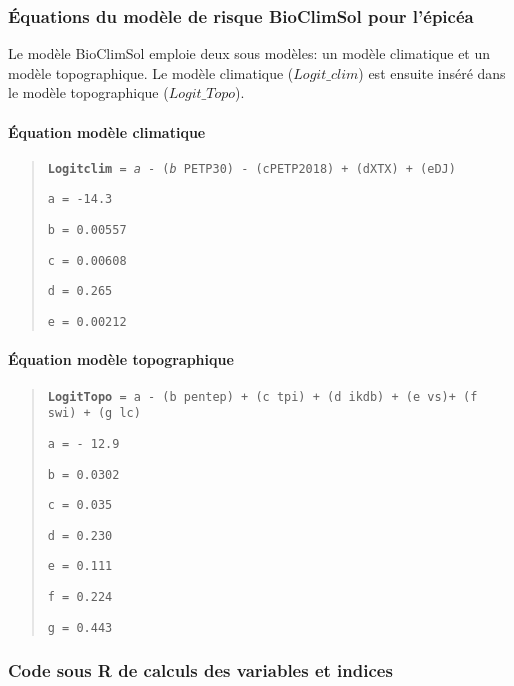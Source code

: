 \subsubsection{Équations du modèle de risque BioClimSol pour l'épicéa}

Le modèle BioClimSol emploie deux sous modèles: un modèle climatique et un modèle topographique. Le modèle climatique ($Logit\_clim$) est ensuite inséré dans le modèle topographique ($Logit\_Topo$). 

 
 \paragraph{Équation modèle climatique}
 \begin{quote}

\texttt{\textbf{Logit\textunderscore clim} = \textit{a} - (\textit{b} \times PETP30) - (c\times PETP2018) + (d\times XTX) + (e\times DJ)}

\texttt{a = -14.3}

\texttt{b = 0.00557}

\texttt {c = 0.00608}

\texttt{d = 0.265}

\texttt{e = 0.00212}
  \end{quote}





     
\paragraph{Équation modèle topographique}
\begin{quote}
    

\texttt{\textbf{Logit\textunderscore Topo} = a - (b \times pente\textunderscore p) + (c \times tpi) + (d \times ikdb) + (e \times vs)+ (f \times swi) + (g \times lc)} 

\texttt{a = - 12.9}

\texttt{b = 0.0302}

\texttt{c = 0.035}

\texttt{d =  0.230}

\texttt{e = 0.111}

\texttt{f = 0.224}

\texttt{g = 0.443}
\end{quote}



\subsubsection{Code sous R de calculs des variables et indices}

